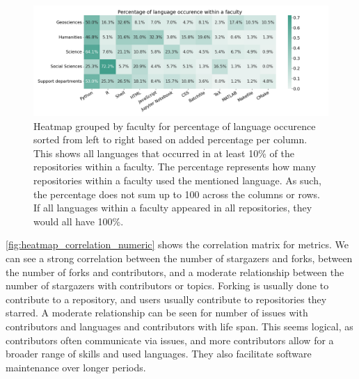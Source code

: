 \vspace{-0.2cm}
\begin{figure}[h!]
\centerline{
\includegraphics[scale=0.5]{figures_results/heatmap_languages_percentage.png}}
\caption{Heatmap grouped by faculty for percentage of language occurence sorted from left to right based on added percentage per column. This shows all languages that occurred in at least 10\% of the repositories within a faculty. The percentage represents how many repositories within a faculty used the mentioned language. As such, the percentage does not sum up to 100 across the columns or rows. If all languages within a faculty appeared in all repositories, they would all have 100\%.
\label{fig:heatmap_languages_percentage}}
\end{figure}


\vspace{-0.3cm}
\autoref{fig:heatmap_correlation_numeric} shows the correlation matrix for metrics. We can see a strong correlation between the number of stargazers and forks, between the number of forks and contributors, and a moderate relationship between the number of stargazers with contributors or topics. Forking is usually done to contribute to a repository, and users usually contribute to repositories they starred. A moderate relationship can be seen for number of issues with contributors and languages and contributors with life span. This seems logical, as contributors often communicate via issues, and more contributors allow for a broader range of skills and used languages. They also facilitate software maintenance over longer periods.

